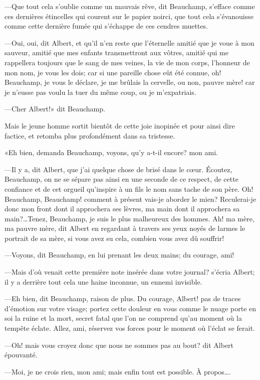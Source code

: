 —Que tout cela s'oublie comme un mauvais rêve, dit Beauchamp, s'efface comme ces dernières étincelles qui courent sur le papier noirci, que tout cela s'évanouisse comme cette dernière fumée qui s'échappe de ces cendres muettes. 

—Oui, oui, dit Albert, et qu'il n'en reste que l'éternelle amitié que je voue à mon sauveur, amitié que mes enfants transmettront aux vôtres, amitié qui me rappellera toujours que le sang de mes veines, la vie de mon corps, l'honneur de mon nom, je vous les dois; car si une pareille chose eût été connue, oh! Beauchamp, je vous le déclare, je me brûlais la cervelle, ou non, pauvre mère! car je n'eusse pas voulu la tuer du même coup, ou je m'expatriais. 

—Cher Albert!» dit Beauchamp. 

Mais le jeune homme sortit bientôt de cette joie inopinée et pour ainsi dire factice, et retomba plus profondément dans sa tristesse. 

«Eh bien, demanda Beauchamp, voyons, qu'y a-t-il encore? mon ami. 

—Il y a, dit Albert, que j'ai quelque chose de brisé dans le cœur. Écoutez, Beauchamp, on ne se sépare pas ainsi en une seconde de ce respect, de cette confiance et de cet orgueil qu'inspire à un fils le nom sans tache de son père. Oh! Beauchamp, Beauchamp! comment à présent vais-je aborder le mien? Reculerai-je donc mon front dont il approchera ses lèvres, ma main dont il approchera sa main?\dots Tenez, Beauchamp, je suis le plus malheureux des hommes. Ah! ma mère, ma pauvre mère, dit Albert en regardant à travers ses yeux noyés de larmes le portrait de sa mère, si vous avez su cela, combien vous avez dû souffrir! 

—Voyons, dit Beauchamp, en lui prenant les deux mains; du courage, ami! 

—Mais d'où venait cette première note insérée dans votre journal? s'écria Albert; il y a derrière tout cela une haine inconnue, un ennemi invisible. 

—Eh bien, dit Beauchamp, raison de plus. Du courage, Albert! pas de traces d'émotion sur votre visage; portez cette douleur en vous comme le nuage porte en soi la ruine et la mort, secret fatal que l'on ne comprend qu'au moment où la tempête éclate. Allez, ami, réservez vos forces pour le moment où l'éclat se ferait. 

—Oh! mais vous croyez donc que nous ne sommes pas au bout? dit Albert épouvanté. 

—Moi, je ne crois rien, mon ami; mais enfin tout est possible. À propos\dots. 

